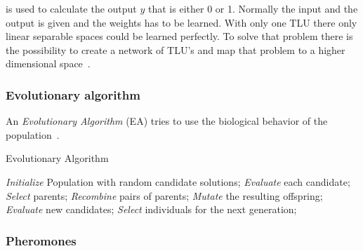 is used to calculate the output $y$ that is either 0 or 1.
Normally the input and the output is given and the weights has to be learned. With only one TLU there only linear separable spaces could be learned perfectly.
To solve that problem there is the possibility to create a network of TLU's and map that problem to a higher dimensional space~\cite{ci_kruse}.




\subsubsection{Evolutionary algorithm} 
An \textit{Evolutionary Algorithm} (EA) tries to use the biological behavior of the population~\cite{evo}. 


\begin{algorithm}
\caption{Evolutionary Algorithm~\cite{evo}}
\label{alg:evo}
\begin{algorithmic}
\State \emph{Initialize} Population with random candidate solutions;
\State \emph{Evaluate} each candidate;
\State \emph{Select} parents;
\State \emph{Recombine} pairs of parents;
\State \emph{Mutate} the resulting offspring;
\State \emph{Evaluate} new candidates;
\State \emph{Select} individuals for the next generation;
\EndWhile
\end{algorithmic}
\end{algorithm}




\subsubsection{Pheromones} 



